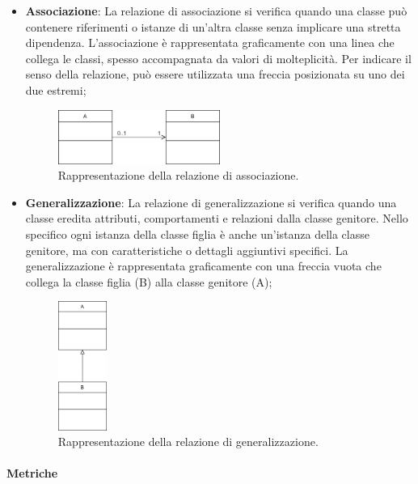 \documentclass[10pt]{article}
\begin{document}
\begin{justify}
\begin{itemize}
            \item \textbf{Associazione}: La relazione di associazione si verifica quando una classe può contenere riferimenti o istanze di un’altra classe senza implicare una stretta dipendenza. L'associazione è rappresentata graficamente con una linea che collega le classi, spesso accompagnata da valori di molteplicità. Per indicare il senso della relazione, può essere utilizzata una freccia posizionata su uno dei due estremi;
            \begin{figure}[H]
            \centering
            \includegraphics[width=0.5\textwidth]{AssociazioneClasse.png}
            \caption{Rappresentazione della relazione di associazione.}
            \end{figure}

            \item \textbf{Generalizzazione}: La relazione di generalizzazione si verifica quando una classe eredita attributi, comportamenti e relazioni dalla classe genitore. Nello specifico ogni istanza della classe figlia è anche un'istanza della classe genitore, ma con caratteristiche o dettagli aggiuntivi specifici. La generalizzazione è rappresentata graficamente con una freccia vuota che collega la classe figlia (B) alla classe genitore (A);
            \begin{figure}[H]
            \centering
            \includegraphics[width=0.15\textwidth]{GeneralizzazioneClasse.png}
            \caption{Rappresentazione della relazione di generalizzazione.}
            \end{figure}
        \end{itemize}

        \paragraph{Metriche}


\end{justify}
\end{document}
